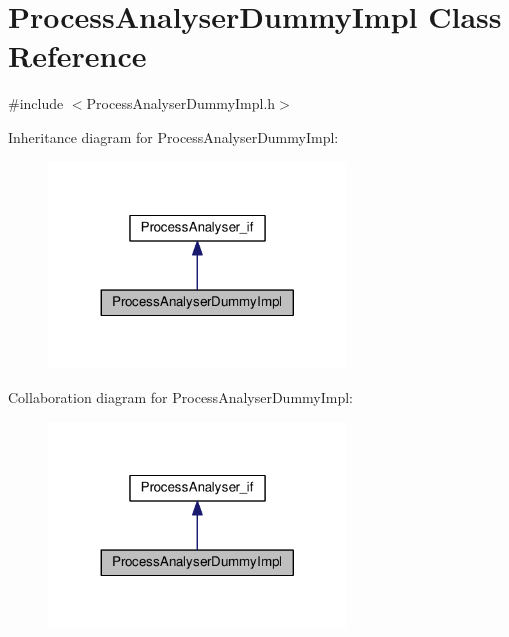 \hypertarget{class_process_analyser_dummy_impl}{}\section{Process\+Analyser\+Dummy\+Impl Class Reference}
\label{class_process_analyser_dummy_impl}


{\ttfamily \#include $<$Process\+Analyser\+Dummy\+Impl.\+h$>$}



Inheritance diagram for Process\+Analyser\+Dummy\+Impl\+:
\nopagebreak
\begin{figure}[H]
\begin{center}
\leavevmode
\includegraphics[width=224pt]{class_process_analyser_dummy_impl__inherit__graph}
\end{center}
\end{figure}


Collaboration diagram for Process\+Analyser\+Dummy\+Impl\+:
\nopagebreak
\begin{figure}[H]
\begin{center}
\leavevmode
\includegraphics[width=224pt]{class_process_analyser_dummy_impl__coll__graph}
\end{center}
\end{figure}

